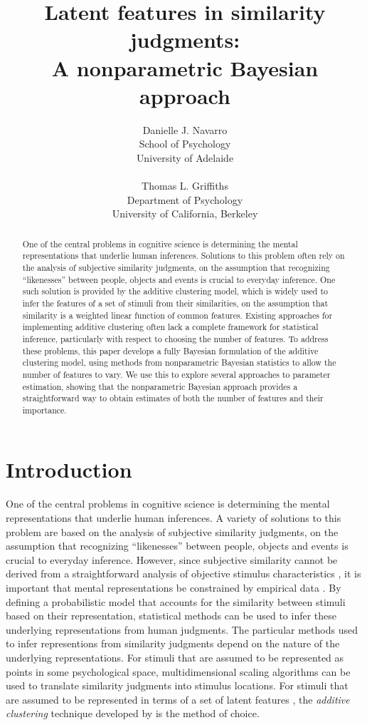 \documentclass[11pt]{article}
\title{Latent features in similarity judgments:\\ A nonparametric Bayesian approach}
\author{Danielle J. Navarro  \\
	School of Psychology  \\
	University of Adelaide \\ \\
	Thomas L. Griffiths \\
	Department of Psychology \\
	University of California, Berkeley}
\date{}
\newcommand{\presec}{}
\newcommand{\postsec}{}
\begin{document}
\maketitle

\begin{abstract}\noindent
One of the central problems in cognitive science is determining the mental representations that underlie human inferences. Solutions to this problem often rely on the analysis of subjective similarity judgments, on the assumption that recognizing ``likenesses'' between people, objects and events is crucial to everyday inference. One such solution is provided by the additive clustering model, which is widely used to infer the features of a set of stimuli from their similarities, on the assumption that similarity is a weighted linear function of common features. Existing approaches for implementing additive clustering often lack a complete framework for statistical inference, particularly with respect to choosing the number of features. To address these problems, this paper develops a fully Bayesian formulation of the additive clustering model, using methods from nonparametric Bayesian statistics to allow the number of features to vary. We use this to explore several approaches to parameter estimation, showing that the nonparametric Bayesian approach provides a straightforward way to obtain estimates of both the number of features and their importance.
\end{abstract}
\newpage

\presec \section{Introduction} \postsec

One of the central problems in cognitive science is determining the mental representations that underlie human inferences. A variety of solutions to this problem are based on the analysis of subjective similarity judgments, on the assumption that recognizing ``likenesses'' between people, objects and events is crucial to everyday inference. However, since subjective similarity cannot be derived from a straightforward analysis of objective stimulus characteristics \cite{goodman72}, it is important that mental representations be constrained by empirical data \cite{komatsu92,lee98}. By defining a probabilistic model that accounts for the similarity between stimuli based on their representation, statistical methods can be used to infer these underlying representations from human judgments. The particular methods used to infer representions from similarity judgments depend on the nature of the underlying representations. For stimuli that are assumed to be represented as points in some psychological space, multidimensional scaling algorithms \cite{torgerson58} can be used to translate similarity judgments into stimulus locations. For stimuli that are assumed to be represented in terms of a set of latent features \cite{tversky77}, the {\em additive clustering} technique developed by  is the method of choice.
\end{document}
